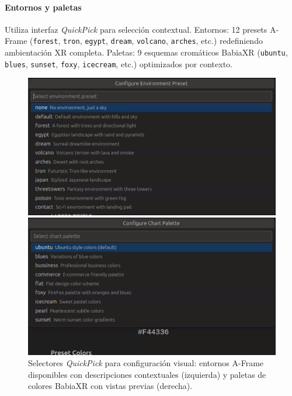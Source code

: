 \documentclass[a4paper, 12pt]{book}
\begin{document}
\paragraph{Entornos y paletas}
Utiliza interfaz \emph{QuickPick} para selección contextual. Entornos: 12 presets A-Frame (\texttt{forest}, \texttt{tron}, \texttt{egypt}, \texttt{dream}, \texttt{volcano}, \texttt{arches}, etc.) redefiniendo ambientación XR completa. Paletas: 9 esquemas cromáticos BabiaXR (\texttt{ubuntu}, \texttt{blues}, \texttt{sunset}, \texttt{foxy}, \texttt{icecream}, etc.) optimizados por contexto.

\begin{figure}[H]
\centering
\begin{minipage}[b]{0.48\textwidth}
\centering
\includegraphics[width=\textwidth]{img/ui-environment-preset-quickpick.png}
\end{minipage}
\hfill
\begin{minipage}[b]{0.48\textwidth}
\centering
\includegraphics[width=\textwidth]{img/ui-chart-palette-quickpick.png}
\end{minipage}
\caption{Selectores \emph{QuickPick} para configuración visual: entornos A-Frame disponibles con descripciones contextuales (izquierda) y paletas de colores BabiaXR con vistas previas (derecha).}
\label{fig:ui-quickpick-selectors}
\end{figure}
\end{document}
